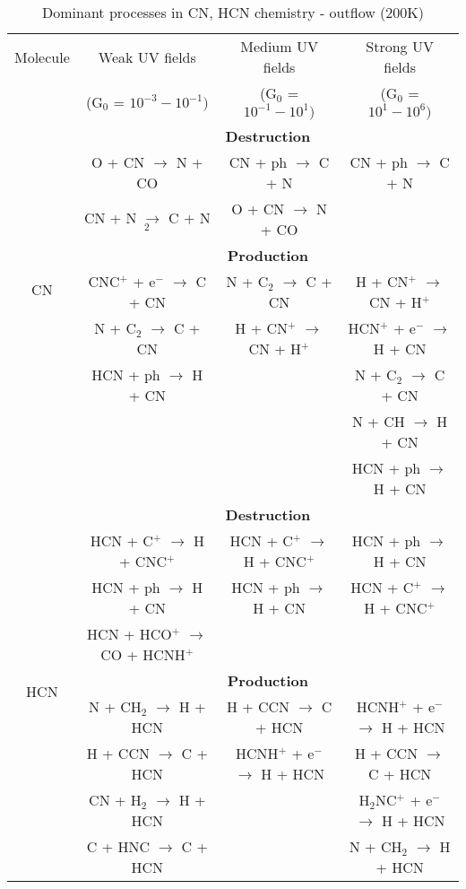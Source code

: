 \documentclass{aa}
\begin{document}
\begin{table*}
\caption{Dominant processes in CN, HCN chemistry - outflow (200K)}             %
\label{reactions}      %
\centering                          %
\begin{tabular}{c c c c} 
\hline\hline  
Molecule & Weak UV fields  & Medium UV fields  & Strong UV fields  \\
& (G$_0$ = $10^{-3} - 10^{-1})$ & (G$_0$ = $10^{-1} - 10^{1})$ & (G$_0$ = $10^{1} - 10^{6})$ \\
\hline
\multirow{8}{*}{CN} & \multicolumn{3}{c}{\textbf{Destruction}}\\
&O + CN $\rightarrow$ N + CO & CN + ph $\rightarrow$ C + N & CN + ph $\rightarrow$ C + N\\
&CN + N $\rightarrow$ C + N$_2$ & O + CN $\rightarrow$ N + CO & \\ \vspace{2.5 pt}
&\multicolumn{3}{c}{\textbf{Production}}\\
&CNC$^+$ + e$^-$ $\rightarrow$ C + CN & N + C$_2$ $\rightarrow$ C + CN &  H + CN$^+$ $\rightarrow$ CN + H$^+$\\
&N + C$_2$ $\rightarrow$ C + CN & H + CN$^+$ $\rightarrow$ CN + H$^+$ & HCN$^+$ + e$^-$ $\rightarrow$ H + CN\\ 
&HCN + ph $\rightarrow$ H + CN &  & N + C$_2$ $\rightarrow$ C + CN\\
&  &   & N + CH $\rightarrow$ H + CN\\ 
&  &   & HCN + ph $\rightarrow$ H + CN\\ \hline
\multirow{9}{*}{HCN} & \multicolumn{3}{c}{\textbf{Destruction}}\\
&HCN + C$^+$ $\rightarrow$ H + CNC$^+$ & HCN + C$^+$ $\rightarrow$ H + CNC$^+$ &  HCN + ph $\rightarrow$ H + CN\\
&HCN + ph $\rightarrow$ H + CN &HCN + ph $\rightarrow$ H + CN & HCN + C$^+$ $\rightarrow$ H + CNC$^+$\\ 
&HCN + HCO$^+$ $\rightarrow$ CO + HCNH$^+$ &  &  \\ \vspace{2.5 pt}
&\multicolumn{3}{c}{\textbf{Production}}\\
&N + CH$_2$ $\rightarrow$ H + HCN & H + CCN $\rightarrow$ C + HCN & HCNH$^+$ + e$^-$ $\rightarrow$ H + HCN\\
&H + CCN $\rightarrow$ C + HCN & HCNH$^+$ + e$^-$ $\rightarrow$ H + HCN & H + CCN $\rightarrow$ C + HCN\\
&CN + H$_2$ $\rightarrow$ H + HCN & & H$_2$NC$^+$ + e$^-$ $\rightarrow$ H + HCN \\ 
&C + HNC $\rightarrow$ C + HCN & & N + CH$_2$ $\rightarrow$ H + HCN \\ \hline
\end{tabular}
\end{table*} 
\end{document}
